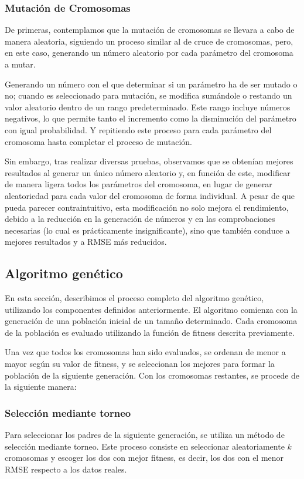 \documentclass[conference,a4paper]{IEEEtran}
\begin{document}
\subsubsection{Mutación de Cromosomas}
De primeras, contemplamos que la mutación de cromosomas se llevara a cabo de manera aleatoria, siguiendo un proceso similar al de cruce de cromosomas, pero, en este caso, generando un número aleatorio por cada parámetro del cromosoma a mutar.


Generando un número con el que determinar si un parámetro ha de ser mutado o no; cuando es seleccionado para mutación, se modifica sumándole o restando un valor aleatorio dentro de un rango predeterminado. Este rango incluye números negativos, lo que permite tanto el incremento como la disminución del parámetro con igual probabilidad. Y repitiendo este proceso para cada parámetro del cromosoma hasta completar el proceso de mutación.

Sin embargo, tras realizar diversas pruebas, observamos que se obtenían mejores resultados al generar un único número aleatorio y, en función de este, modificar de manera ligera todos los parámetros del cromosoma, en lugar de generar aleatoriedad para cada valor del cromosoma de forma individual. A pesar de que pueda parecer contraintuitivo, esta modificación no solo mejora el rendimiento, debido a la reducción en la generación de números y en las comprobaciones necesarias (lo cual es prácticamente insignificante), sino que también conduce a mejores resultados y a RMSE más reducidos.


\subsection{Algoritmo genético}
En esta sección, describimos el proceso completo del algoritmo genético, utilizando los componentes definidos anteriormente. El algoritmo comienza con la generación de una población inicial de un tamaño determinado. Cada cromosoma de la población es evaluado utilizando la función de fitness descrita previamente.

Una vez que todos los cromosomas han sido evaluados, se ordenan de menor a mayor según su valor de fitness, y se seleccionan los mejores para formar la población de la siguiente generación. Con los cromosomas restantes, se procede de la siguiente manera:

\subsubsection{Selección mediante torneo}
Para seleccionar los padres de la siguiente generación, se utiliza un método de selección mediante torneo. Este proceso consiste en seleccionar aleatoriamente \(k\) cromosomas y escoger los dos con mejor fitness, es decir, los dos con el menor RMSE respecto a los datos reales.
\end{document}
